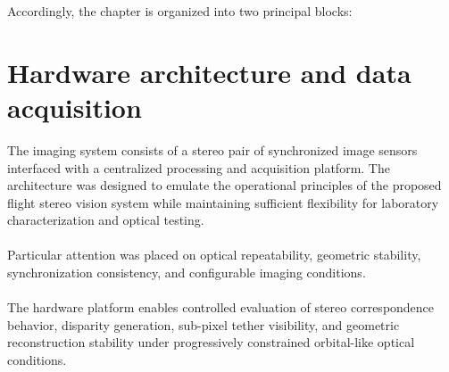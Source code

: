Accordingly, the chapter is organized into two principal blocks:

\section{Hardware architecture and data acquisition}
\label{sec:Hardware-architecture-data-acquisition}

The imaging system consists of a stereo pair of synchronized image sensors interfaced with a centralized processing and acquisition platform. The architecture was designed to emulate the operational principles of the proposed flight stereo vision system while maintaining sufficient flexibility for laboratory characterization and optical testing.
\\\\
Particular attention was placed on optical repeatability, geometric stability, synchronization consistency, and configurable imaging conditions.
\\\\
The hardware platform enables controlled evaluation of stereo correspondence behavior, disparity generation, sub-pixel tether visibility, and geometric reconstruction stability under progressively constrained orbital-like optical conditions.

